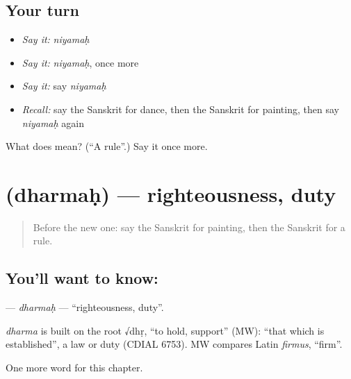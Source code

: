 \subsection*{Your turn}
\begin{itemize}
\raggedright
  \item \emph{Say it:} \emph{niyamaḥ}
  \item \emph{Say it:} \emph{niyamaḥ}, once more
  \item \emph{Say it:} say \emph{niyamaḥ}
  \item \emph{Recall:} say the Sanskrit for dance, then the Sanskrit for painting, then say \emph{niyamaḥ} again
\end{itemize}

\begin{tcolorbox}[breakable,colback=teal!4,colframe=teal!35!black,title={Before you move on}]
What does  mean? (\textquotedblleft{}A rule\textquotedblright{}.) Say it once more.
\end{tcolorbox}
\section[\texorpdfstring{\sk{धर्मः} (dharmaḥ)}{धर्मः (dharmaḥ)}]{ (dharmaḥ) — righteousness, duty}

\label{lesson:SA-C229-dharmah}



\begin{quote}
Before the new one: say the Sanskrit for painting, then the Sanskrit for a rule.
\end{quote}

\subsection*{You'll want to know: }
\textbf{} — \emph{dharmaḥ} — \textquotedblleft{}righteousness, duty\textquotedblright{}.

\begin{cousinweb}
\emph{dharma} is built on the root √dhṛ, \textquotedblleft{}to hold, support\textquotedblright{} (MW): \textquotedblleft{}that which is established\textquotedblright{}, a law or duty (CDIAL 6753). MW compares Latin \emph{firmus}, \textquotedblleft{}firm\textquotedblright{}.
\end{cousinweb}

\begin{grammarlens}[title={What you've built}]
One more word for this chapter.
\end{grammarlens}

